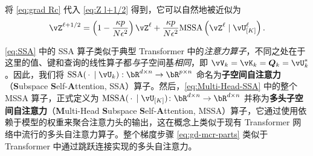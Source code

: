 \documentclass[../../book-main.tex]{subfiles}
\begin{document}
将 \eqref{eq:grad Rc} 代入 \eqref{eq:Z l+1/2} 得到，它可以自然地被近似为
\begin{equation}
    \vZ^{\ell + 1/2} = \left(1 - \frac{\kappa p}{N\epsilon^2}\right) \vZ^{\ell} + \frac{\kappa p}{N\epsilon^2} \mathrm{MSSA}\left({\vZ^{\ell} \mid \vU_{[K]}^{\ell}}\right).  \label{eq:gd-mcr-parts}
\end{equation}



\begin{remark}
    \eqref{eq:SSA} 中的 SSA 算子类似于典型 Transformer \citep{vaswani2017attention} 中的\textit{注意力算子}，不同之处在于这里的值、键和查询的线性算子都\textit{与}子空间基\textit{相同}，即 $\vV_{k} = \vK_{k} = \bm{Q}_{k} = \vU_k^*$。因此，我们将 $\mathrm{SSA}({\spcdot\mid\vU_k}): \bR^{d\times n} \rightarrow \bR^{p\times n}$ 命名为\textbf{子空间自注意力}（\textbf{S}ubspace \textbf{S}elf-\textbf{A}ttention, SSA）算子。然后，\eqref{eq:Multi-Head-SSA} 中的整个 MSSA 算子，正式定义为 \(\mathrm{MSSA}({\spcdot \mid \vU_{[K]}}) \colon \bR^{d \times n} \to \bR^{d \times n}\) 并称为\textbf{多头子空间自注意力}（\textbf{M}ulti-Head \textbf{S}ubspace \textbf{S}elf-\textbf{A}ttention, MSSA）算子，它通过使用依赖于模型的权重来聚合注意力头的输出，这在概念上类似于现有 Transformer 网络中流行的多头自注意力算子。整个梯度步骤 \eqref{eq:gd-mcr-parts} 类似于 Transformer 中通过跳跃连接实现的多头自注意力。
\end{remark}
\end{document}
